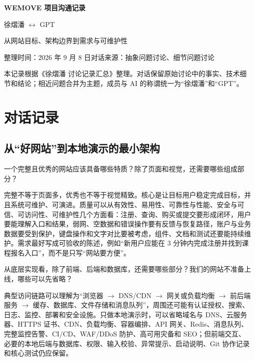 \documentclass[UTF8,a4paper,11pt]{ctexart}
\newcommand{\sourceNote}{%
  \begin{tcolorbox}[
    enhanced,
    colback=black!2,
    colframe=black!12,
    boxrule=0.4pt,
    arc=2mm,
    left=10pt,
    right=10pt,
    top=7pt,
    bottom=7pt,
    fontupper=\small
  ]
  本记录根据《徐熠潘 讨论记录汇总》整理。对话保留原始讨论中的事实、技术细节和结论；相近问题合并为主题，成员与 AI 的称谓统一为“徐熠潘”和“GPT”。
  \end{tcolorbox}
}
\begin{document}
\begin{center}
  {\LARGE\bfseries WEMOVE 项目沟通记录}\par
  \vspace{0.35em}
  {\large 徐熠潘 $\leftrightarrow$ GPT}\par
  \vspace{0.45em}
  {\small\color{softtext}从网站目标、架构边界到需求与可维护性}\par
  \vspace{0.9em}
  {\small 整理时间：2026 年 9 月 8 日\quad\textbar\quad 对话来源：抽象问题讨论、细节问题讨论}
\end{center}

\sourceNote

\tableofcontents
\newpage

\section{对话记录}

\subsection{从“好网站”到本地演示的最小架构}

\begin{membermsg}
一个完整且优秀的网站应该具备哪些特质？除了页面和视觉，还需要哪些组成部分？
\end{membermsg}

\begin{gptmsg}
完整不等于页面多，优秀也不等于视觉精致。核心是让目标用户稳定完成目标，并且系统可维护、可演进。质量可以从有效性、易用性、可靠性与性能、安全与可信、可访问性、可维护性几个方面看：注册、查询、购买或提交要形成闭环，用户要能理解入口和结果，弱网、空数据和错误操作要有反馈与恢复路径，账户与业务数据要受到保护，键盘操作和文字对比要被考虑，组件、文档和测试还要能持续维护。需求最好写成可验收的陈述，例如“新用户应能在 3 分钟内完成注册并找到课程报名入口”，而不是只写“网站要方便”。
\end{gptmsg}

\begin{membermsg}
从底层实现看，除了前端、后端和数据库，还需要哪些部分？我们的网站不准备上线，哪些可以先省略？
\end{membermsg}

\begin{gptmsg}
典型访问链路可以理解为“浏览器 $\rightarrow$ DNS/CDN $\rightarrow$ 网关或负载均衡 $\rightarrow$ 前后端服务 $\rightarrow$ 缓存、数据库、文件存储和消息队列”，周围还可能有认证授权、搜索、日志、监控、部署和安全设施。只做本地演示时，可以省略域名与 DNS、云服务器、HTTPS 证书、CDN、负载均衡、容器编排、API 网关、Redis、消息队列、完整监控告警、CI/CD、WAF/DDoS 防护、高可用灾备和 SEO；但前端交互、必要的本地后端与数据库、权限、输入校验、异常提示、启动说明、Git 协作记录和核心测试仍应保留。
\end{gptmsg}
\end{document}
